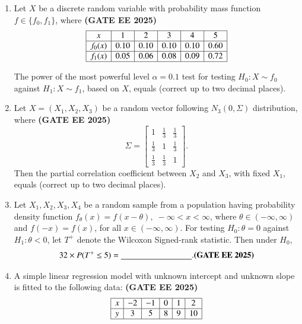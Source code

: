 \documentclass[journal,12pt,onecolumn]{IEEEtran}
\theoremstyle{remark}
\begin{document}
\begin{enumerate}
\item Let $X$ be a discrete random variable with probability mass function $f \in \{f_0,f_1\}$, where
\hfill \textbf{(GATE EE 2025)}
\[
\begin{array}{|c|c|c|c|c|c|}
\hline
x & 1 & 2 & 3 & 4 & 5 \\ \hline
f_0(x) & 0.10 & 0.10 & 0.10 & 0.10 & 0.60 \\ \hline
f_1(x) & 0.05 & 0.06 & 0.08 & 0.09 & 0.72 \\ \hline
\end{array}
\]

The power of the most powerful level $\alpha=0.1$ test for testing 
$H_0: X \sim f_0$ against $H_1: X \sim f_1$, based on $X$, equals 
\underline{\hspace{3cm}} (correct up to two decimal places). \\[1em]



\item Let $X = (X_1, X_2, X_3)$ be a random vector following $N_3(0, \Sigma)$ distribution, where 
\hfill \textbf{(GATE EE 2025)}
\[
\Sigma = 
\begin{bmatrix}
1 & \tfrac{1}{3} & \tfrac{1}{3} \\
\tfrac{1}{3} & 1 & \tfrac{1}{3} \\
\tfrac{1}{3} & \tfrac{1}{3} & 1
\end{bmatrix}.
\]
Then the partial correlation coefficient between $X_2$ and $X_3$, with fixed $X_1$, equals 
\underline{\hspace{3cm}} (correct up to two decimal places). \\[1em]

\item Let $X_1, X_2, X_3, X_4$ be a random sample from a population having probability density function $f_\theta(x) = f(x-\theta), \; -\infty < x < \infty$, where $\theta \in (-\infty, \infty)$ and $f(-x)=f(x)$, for all $x \in (-\infty, \infty)$. For testing $H_0: \theta=0$ against $H_1: \theta<0$, let $T^+$ denote the Wilcoxon Signed-rank statistic. Then under $H_0$, 
\[
32 \times P(T^+ \leq 5) = \underline{\hspace{3cm}}. \hfill \textbf{(GATE EE 2025)}
\]
\item A simple linear regression model with unknown intercept and unknown slope is fitted to the following data: \hfill \textbf{(GATE EE 2025)}
\[
\begin{array}{|c|c|c|c|c|c|}
\hline
x & -2 & -1 & 0 & 1 & 2 \\ \hline
y & 3 & 5 & 8 & 9 & 10 \\ \hline
\end{array}
\]


\end{enumerate}
\end{document}
